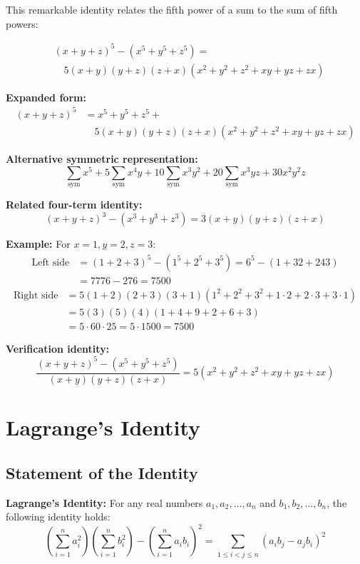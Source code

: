 This remarkable identity relates the fifth power of a sum to the sum of fifth powers:

\[
\begin{aligned}
&(x + y + z)^5 - (x^5 + y^5 + z^5) = \\
&\quad 5(x + y)(y + z)(z + x)(x^2 + y^2 + z^2 + xy + yz + zx)
\end{aligned}
\]

\textbf{Expanded form:}
\[
\begin{aligned}
(x + y + z)^5 &= x^5 + y^5 + z^5 + \\
&\quad 5(x + y)(y + z)(z + x)(x^2 + y^2 + z^2 + xy + yz + zx)
\end{aligned}
\]

\textbf{Alternative symmetric representation:}
\[
\sum_{\text{sym}} x^5 + 5\sum_{\text{sym}} x^4y + 10\sum_{\text{sym}} x^3y^2 + 20\sum_{\text{sym}} x^3yz + 30x^2y^2z
\]

\textbf{Related four-term identity:}
\[
(x + y + z)^3 - (x^3 + y^3 + z^3) = 3(x + y)(y + z)(z + x)
\]

\textbf{Example:} For \(x=1, y=2, z=3\):
\begin{align*}
\text{Left side} &= (1+2+3)^5 - (1^5 + 2^5 + 3^5) = 6^5 - (1 + 32 + 243) \\
&= 7776 - 276 = 7500
\end{align*}
\begin{align*}
\text{Right side} &= 5(1+2)(2+3)(3+1)(1^2+2^2+3^2+1\cdot2+2\cdot3+3\cdot1) \\
&= 5(3)(5)(4)(1+4+9+2+6+3) \\
&= 5 \cdot 60 \cdot 25 = 5 \cdot 1500 = 7500
\end{align*}

\textbf{Verification identity:}
\[
\frac{(x+y+z)^5 - (x^5+y^5+z^5)}{(x+y)(y+z)(z+x)} = 5(x^2+y^2+z^2+xy+yz+zx)
\]

\section{Lagrange's Identity}
\subsection*{Statement of the Identity}

\begin{theorembox} \textbf{Lagrange's Identity: }
For any real numbers \(a_1, a_2, \ldots, a_n\) and \(b_1, b_2, \ldots, b_n\), the following identity holds:
\[
\boxed{\left(\sum_{i=1}^{n} a_i^2\right)\left(\sum_{i=1}^{n} b_i^2\right) - \left(\sum_{i=1}^{n} a_i b_i\right)^2 = \sum_{1 \le i < j \le n} (a_i b_j - a_j b_i)^2}
\]
\end{theorembox}

